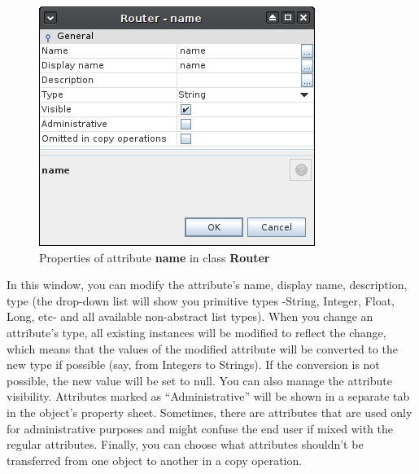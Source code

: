 \documentclass[a4paper]{article}
\begin{document}
\begin{itemize}
				\begin{figure}[h!]
					\centering
					\includegraphics[width=0.4\linewidth]{img/class_attribute_details.png}
					\caption{Properties of attribute \textbf{name} in class \textbf{Router}}
					\label{fig:class_attribute_details}
				\end{figure}
			\end{itemize}
			In this window, you can modify the attribute's name, display name, description, type  (the drop-down list will show you primitive types -String, Integer, Float, Long, etc- and all available non-abstract list types). When you change an attribute's type, all existing instances will be	modified to reflect the change, which means that the values of the modified attribute will be converted to the new type if possible (say, from Integers to Strings). If the conversion is not possible, the new value will be set to null. You  can  also  manage  the  attribute  visibility. Attributes marked as “Administrative” will be shown in a separate tab in the object's property sheet. Sometimes, there are  attributes that are used only for administrative purposes and might confuse the end user if mixed with the regular attributes. Finally, you can choose what attributes shouldn't be transferred from one object to another in a copy operation.
			
\end{document}
